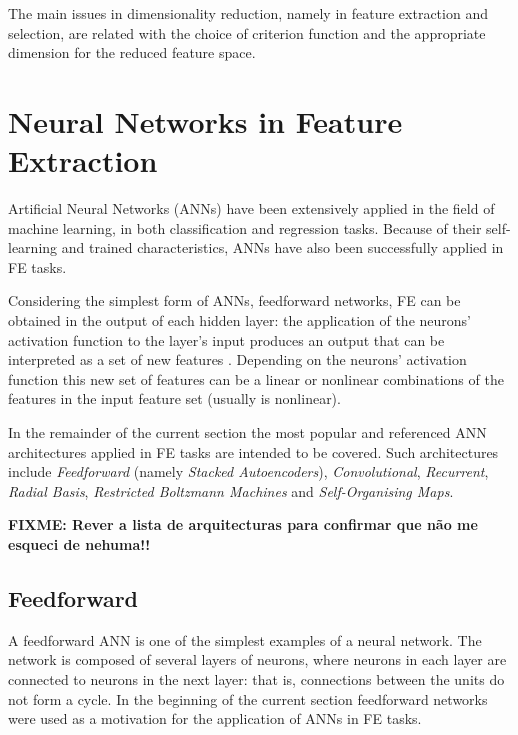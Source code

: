 \documentclass[9pt,journal,compsoc]{IEEEtran}
\begin{document}
The main issues in dimensionality reduction, namely in feature extraction and selection, are related with the choice of criterion function and the appropriate dimension for the reduced feature space.

\section{Neural Networks in Feature Extraction}\label{sec:anns_feature_extraction}

Artificial Neural Networks (ANNs) have been extensively applied in the field of machine learning, in both classification and regression tasks. Because of their self-learning and trained characteristics, ANNs have also been successfully applied in FE tasks.

Considering the simplest form of ANNs, feedforward networks, FE can be obtained in the output of each hidden layer: the application of the neurons' activation function to the layer's input produces an output that can be interpreted as a set of new features \cite{jain2000statistical}. Depending on the neurons' activation function this new set of features can be a linear or nonlinear combinations of the features in the input feature set (usually is nonlinear).

In the remainder of the current section the most popular and referenced ANN architectures applied in FE tasks are intended to be covered. Such architectures include \emph{Feedforward} (namely \emph{Stacked Autoencoders}), \emph{Convolutional}, \emph{Recurrent}, \emph{Radial Basis}, \emph{Restricted Boltzmann Machines} and \emph{Self-Organising Maps}\cite{jain2000statistical, masci2011stacked, kvascev2012radial, fabius2014variational, cho2014learning, marchi2017deep}.

\textbf{FIXME: Rever a lista de arquitecturas para confirmar que não me esqueci de nehuma!!}

\subsection{Feedforward}

A feedforward ANN is one of the simplest examples of a neural network. The network is composed of several layers of neurons, where neurons in each layer are connected to neurons in the next layer: that is, connections between the units do not form a cycle. In the beginning of the current section feedforward networks were used as a motivation for the application of ANNs in FE tasks.
\end{document}
